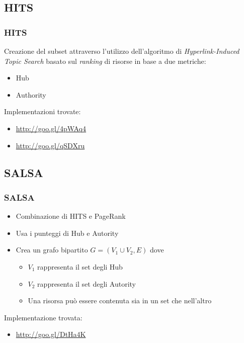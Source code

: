 \documentclass{beamer}
\begin{document}
\subsection{HITS}
\begin{frame}
	\frametitle{HITS}
	Creazione del subset attraverso l'utilizzo dell'algoritmo di \emph{Hyperlink-Induced Topic Search} basato sul \emph{ranking} di risorse in base a due metriche:
	\begin{itemize}
		\item Hub
		\item Authority
	\end{itemize}
	Implementazioni trovate:
	\begin{itemize}
		\item \url{http://goo.gl/4pWAq4}
		\item \url{http://goo.gl/qSDXru}
	\end{itemize} 
\end{frame}
\subsection{SALSA}
\begin{frame}
	\frametitle{SALSA}
	\begin{itemize}
		\item Combinazione di HITS e PageRank
		\item Usa i punteggi di Hub e Autority
		\item Crea un grafo bipartito $G=(V_1 \cup V_2,E)$ dove \begin{itemize}
			\item $V_1$ rappresenta il set degli Hub
			\item $V_2$ rappresenta il set degli Autority
			\item Una risorsa può essere contenuta sia in un set che nell'altro
		\end{itemize}
	\end{itemize}
	Implementazione trovata:
	\begin{itemize}
	\item \url{http://goo.gl/DtHa4K}
	\end{itemize}
\end{frame}
\end{document}
